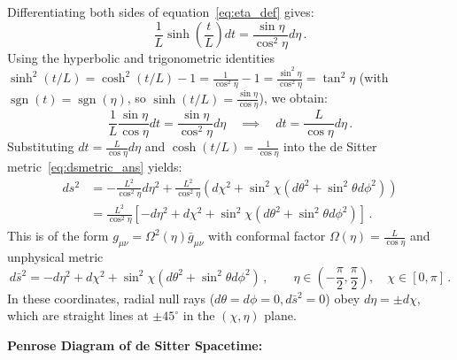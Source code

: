 \documentclass[12pt]{article}
\newcommand{\be}{\begin{equation}}
\newcommand{\ee}{\end{equation}}
\begin{document}
\begin{enumerate}[label=\alph*)]
Differentiating both sides of equation~\eqref{eq:eta_def} gives:
\be
\frac{1}{L} \sinh\left(\frac{t}{L}\right) dt = \frac{\sin\eta}{\cos^2\eta} d\eta \,.
\ee
Using the hyperbolic and trigonometric identities $\sinh^2(t/L) = \cosh^2(t/L) - 1 = \frac{1}{\cos^2\eta} - 1 = \frac{\sin^2\eta}{\cos^2\eta} = \tan^2\eta$ (with $\operatorname{sgn}(t) = \operatorname{sgn}(\eta)$, so $\sinh(t/L) = \frac{\sin\eta}{\cos\eta}$), we obtain:
\be
\frac{1}{L} \frac{\sin\eta}{\cos\eta} dt = \frac{\sin\eta}{\cos^2\eta} d\eta \quad \implies \quad dt = \frac{L}{\cos\eta} d\eta \,.
\ee
Substituting $dt = \frac{L}{\cos\eta} d\eta$ and $\cosh(t/L) = \frac{1}{\cos\eta}$ into the de Sitter metric~\eqref{eq:dsmetric_ans} yields:
\begin{align}
ds^2 &= -\frac{L^2}{\cos^2\eta} d\eta^2 + \frac{L^2}{\cos^2\eta} \left( d\chi^2 + \sin^2\chi \left( d\theta^2 + \sin^2\theta d\phi^2 \right) \right) \nonumber \\
&= \frac{L^2}{\cos^2\eta} \left[ -d\eta^2 + d\chi^2 + \sin^2\chi \left( d\theta^2 + \sin^2\theta d\phi^2 \right) \right] \,.
\end{align}
This is of the form $g_{\mu\nu} = \Omega^2(\eta) \bar{g}_{\mu\nu}$ with conformal factor $\Omega(\eta) = \frac{L}{\cos\eta}$ and unphysical metric
\be
d\bar{s}^2 = -d\eta^2 + d\chi^2 + \sin^2\chi \left( d\theta^2 + \sin^2\theta d\phi^2 \right) \,, \qquad \eta \in \left(-\frac{\pi}{2}, \frac{\pi}{2}\right), \quad \chi \in [0, \pi] \,.
\ee
In these coordinates, radial null rays ($d\theta = d\phi = 0, d\bar{s}^2 = 0$) obey $d\eta = \pm d\chi$, which are straight lines at $\pm 45^\circ$ in the $(\chi, \eta)$ plane.

\medskip
\noindent
\textbf{Penrose Diagram of de Sitter Spacetime:}

\begin{center}
\end{center}
\end{enumerate}
\end{document}
